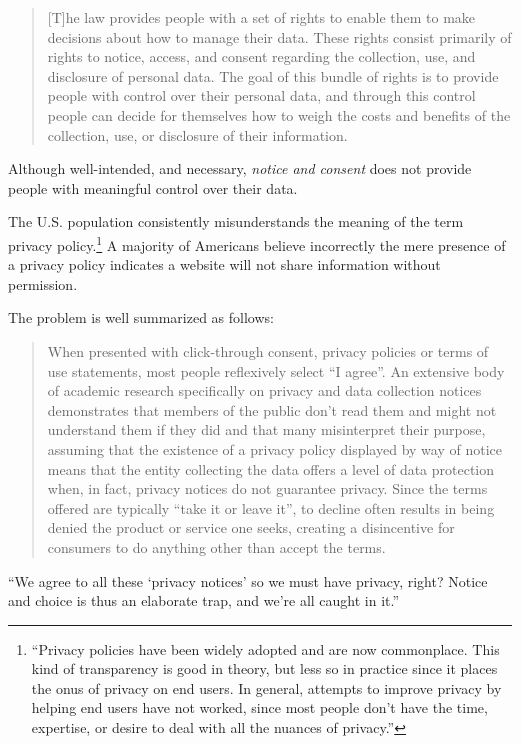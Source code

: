 \documentclass[11pt, oneside]{article}   	%
\begin{document}
\begin{quote}
	[T]he law provides people with a set of rights to enable them to make decisions about how to manage their data. These rights consist primarily of rights to notice, access, and consent regarding the collection, use, and disclosure of personal data. The goal of this bundle of rights is to provide people with control over their  personal data, and through this  control people can decide for themselves how to weigh the costs and benefits of the collection, use, or disclosure of their information.\cite{Solove2012}
\end{quote} 

Although well-intended, and necessary, \emph{notice and consent} does not provide people with meaningful control over their data. 

The U.S. population consistently misunderstands the meaning of the term privacy policy.\footnote{``Privacy policies have been widely adopted and are now commonplace. This kind of transparency is good in theory, but less so in practice since it places the onus of privacy on end users. In general, attempts to improve privacy by helping end users have not worked, since most people don't have the time, expertise, or desire to deal with all the nuances of privacy.''\cite{Hong2023}} A majority of Americans believe incorrectly the mere presence of a privacy policy indicates a website will not share information without permission.\cite{Draper2019} 

The problem is well summarized as follows:
\begin{quote}
	When presented with click-through consent, privacy policies or terms of use statements, most people reflexively select ``I agree''. An extensive body of academic research specifically on privacy and data collection notices demonstrates that members of the public don't read them and might not understand them if they did and that many misinterpret their purpose, assuming that the existence of a privacy policy displayed by way of notice means that the entity collecting the data offers a level of data protection when, in fact, privacy notices do not guarantee privacy. Since the terms offered are typically ``take it or leave it'', to decline often results in being denied the product or service one seeks, creating a disincentive for consumers to do anything other than accept the terms.\cite{Flanagan2020}
\end{quote}

``We agree to all these `privacy notices' so we must have privacy, right? Notice and choice is thus an elaborate trap, and we're all caught in it.''\cite{Richards2021}
\end{document}
